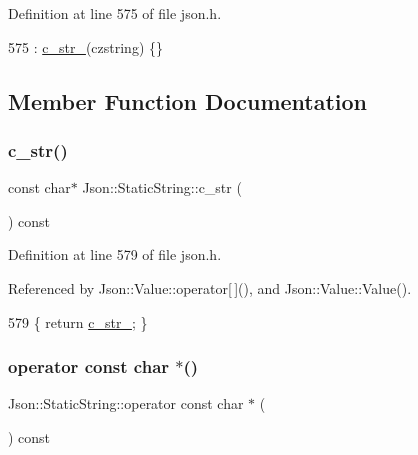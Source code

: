 Definition at line 575 of file json.\+h.


\begin{DoxyCode}
575 : \hyperlink{class_json_1_1_static_string_a9f0d9e8caee8f8db14e2c8c24760dffd}{c\_str\_}(czstring) \{\}
\end{DoxyCode}


\subsection{Member Function Documentation}
\mbox{\label{class_json_1_1_static_string_ad6be703d432d108623bb0aa06b0b90ca}} 
\subsubsection{\texorpdfstring{c\+\_\+str()}{c\_str()}}
{\footnotesize\ttfamily const char$\ast$ Json\+::\+Static\+String\+::c\+\_\+str (\begin{DoxyParamCaption}{ }\end{DoxyParamCaption}) const\hspace{0.3cm}{\ttfamily [inline]}}



Definition at line 579 of file json.\+h.



Referenced by Json\+::\+Value\+::operator\mbox{[}$\,$\mbox{]}(), and Json\+::\+Value\+::\+Value().


\begin{DoxyCode}
579 \{ \textcolor{keywordflow}{return} \hyperlink{class_json_1_1_static_string_a9f0d9e8caee8f8db14e2c8c24760dffd}{c\_str\_}; \}
\end{DoxyCode}
\mbox{\label{class_json_1_1_static_string_a256a6cc0c630aef670848a0f11707b62}} 
\subsubsection{\texorpdfstring{operator const char $\ast$()}{operator const char *()}}
{\footnotesize\ttfamily Json\+::\+Static\+String\+::operator const char $\ast$ (\begin{DoxyParamCaption}{ }\end{DoxyParamCaption}) const\hspace{0.3cm}{\ttfamily [inline]}}



